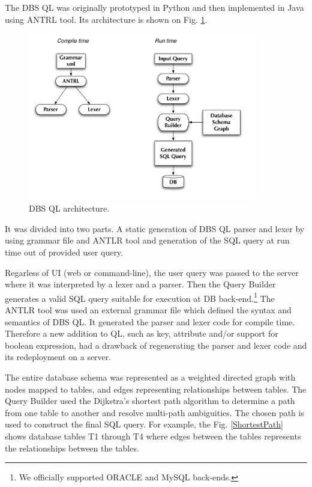 \documentclass[a4paper]{jpconf}
\begin{document}
The DBS QL was originally prototyped in Python and then implemented
in Java using ANTRL tool. Its architecture is shown on Fig. \ref{DBS_QL}.
\begin{figure}[htb]
\centering
\includegraphics[width=100mm]{DBS_QL_architecture.pdf}
\caption{DBS QL architecture.}
\label{DBS_QL}
\end{figure}
It was divided into two parts. A static generation of DBS QL
parser and lexer by using grammar file and ANTLR tool\cite{ANTLR}
and generation of the SQL query at run time out of provided user query.

Regarless of UI (web or command-line), the user query was 
passed to the server where it was interpreted by a lexer and a parser.
Then the Query Builder generates a valid SQL query suitable for
execution at DB back-end.\footnote{We officially supported ORACLE and
MySQL back-ends.} 
The ANTLR tool was used an external grammar file which defined 
the syntax and semantics of DBS QL. It generated the parser and lexer 
code for compile time. Therefore a new addition to QL, such as key,
attribute and/or support for boolean expression, had a drawback of
regenerating the parser and lexer code and its redeployment on a server.
 
The entire database schema was represented as a weighted
directed graph with nodes mapped to tables, and edges 
representing relationships between tables\cite{GraphTool}.
The Query Builder
used the Dijkstra’s shortest path algorithm to determine a 
path from one table to another and resolve multi-path ambiguities.
The chosen path is used to construct the final SQL query. 
For example, the Fig. \ref{ShortestPath} shows database tables 
T1 through T4  where edges between the tables represents the 
relationships between the tables.
\end{document}
